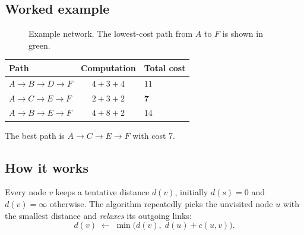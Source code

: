 \documentclass[11pt,a4paper]{article}
\begin{document}
\subsection{Worked example}
\begin{figure}[h]
\centering
{}
\caption{Example network. The lowest-cost path from $A$ to $F$ is shown in green.}
\label{fig:graph}
\end{figure}

\begin{center}
\begin{tabular}{lcl}
\toprule
Path & Computation & Total cost \\
\midrule
$A\to B\to D\to F$ & $4+3+4$ & $11$ \\
$A\to C\to E\to F$ & $2+3+2$ & \textbf{7} \\
$A\to B\to E\to F$ & $4+8+2$ & $14$ \\
\bottomrule
\end{tabular}
\end{center}

The best path is $A\to C\to E\to F$ with cost $7$.

\subsection{How it works}
Every node $v$ keeps a tentative distance $d(v)$, initially $d(s)=0$ and $d(v)=\infty$ otherwise.
The algorithm repeatedly picks the unvisited node $u$ with the smallest distance and \emph{relaxes}
its outgoing links:
\[
  d(v)\;\leftarrow\;\min\bigl(d(v),\; d(u)+c(u,v)\bigr).
\]
\end{document}

